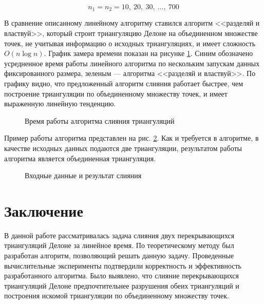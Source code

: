 \documentclass[12pt]{article}
\begin{document}
$$n_1 = n_2 = 10,~20,~30,~\ldots,~700$$

В сравнение описанному линейному алгоритму ставился алгоритм <<разделяй и властвуй>>,
который строит триангуляцию Делоне на объединенном множестве точек,
не учитывая информацию о исходных триангуляциях, и имеет сложность $O(n\log n)$.
График замера времени показан на рисунке \ref{pic:timeWork}.
Синим обозначено усредненное время работы линейного алгоритма по нескольким запускам данных фиксированного размера,
зеленым --- алгоритма <<разделяй и властвуй>>.
По графику видно, что предложенный алгоритм слияния работает быстрее, чем построение триангуляции по объединенному множеству точек,
и имеет выраженную линейную тенденцию.

\begin{figure}[htb!]
	\caption{Время работы алгоритма слияния триангуляций}
	\label{pic:timeWork}
\end{figure}

Пример работы алгоритма представлен на рис. \ref{pic:exp_data}.
Как и требуется в алгоритме, в качестве исходных данных подаются две триангуляции,
результатом работы алгоритма является объединенная триангуляция.

\begin{figure}[htb!]
	\begin{minipage}[h]{1\linewidth}
	\end{minipage}
	\vfill
	\begin{minipage}[h]{1\linewidth}
	\end{minipage}
	\caption{Входные данные и результат слияния}
	\label{pic:exp_data}
\end{figure}

\section{Заключение}
В данной работе рассматривалась задача слияния двух перекрывающихся триангуляций Делоне
за линейное время. По теоретическому методу \cite{MestOverlap} был разработан алгоритм,
позволяющий решать данную задачу.
Проведенные вычислительные эксперименты подтвердили корректность и эффективность разработанного алгоритма.
Было выявлено, что слияние перекрывающихся триангуляций Делоне предпочтительнее
разрушения обеих триангуляций и построения искомой триангуляции по объединенному множеству точек.
\end{document}
